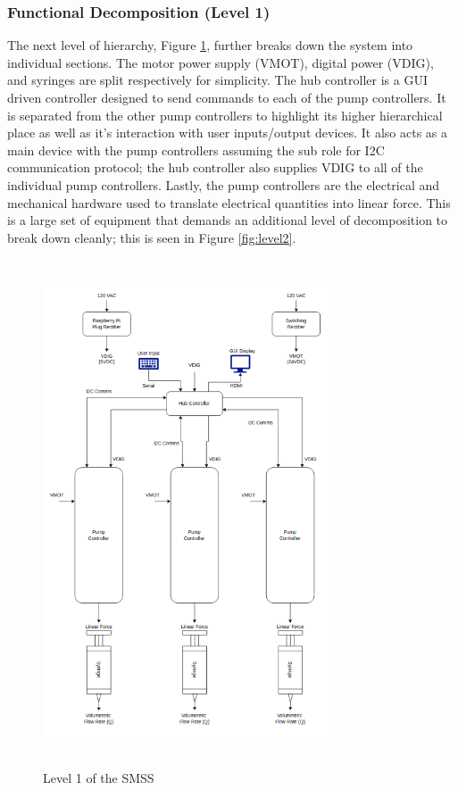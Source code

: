 \documentclass[journal]{IEEEtran}
\begin{document}
        \subsubsection{Functional Decomposition (Level 1) }
            The next level of hierarchy, Figure \ref{fig:level1}, further breaks down the system into individual sections. The motor power supply (VMOT), digital power (VDIG), and syringes are split respectively for simplicity. The hub controller is a GUI driven controller designed to send commands to each of the pump controllers. It is separated from the other pump controllers to highlight its higher hierarchical place as well as it's interaction with user inputs/output devices. It also acts as a main device with the pump controllers assuming the sub role for I2C communication protocol; the hub controller also supplies VDIG to all of the individual pump controllers. Lastly, the pump controllers are the electrical and mechanical hardware used to translate electrical quantities into linear force. This is a large set of equipment that demands an additional level of decomposition to break down cleanly; this is seen in Figure \ref{fig:level2}.
            
            \begin{figure}[H]
                \centering
                \includegraphics[width=8.5cm, height=15cm]{level1_FD}
                \caption{Level 1 of the SMSS}
                \label{fig:level1}
            \end{figure}
        
\end{document}
